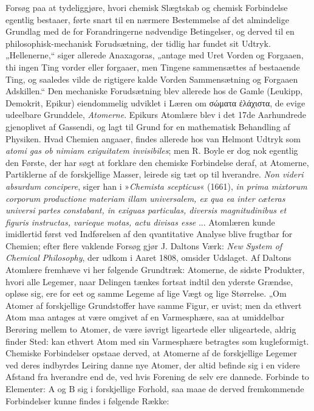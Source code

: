 \documentclass[12pt,a4paper]{book}
\begin{document}
Forsøg paa at tydeliggjøre, hvori chemisk Slægtskab og
chemisk Forbindelse egentlig bestaaer, førte snart til en nærmere
Bestemmelse af det almindelige Grundlag med de for
Forandringerne nødvendige Betingelser, og derved til en
philosophisk-mechanisk Forudsætning, der tidlig har fundet sit
Udtryk. „Hellenerne,“ siger allerede Anaxagoras, „antage med
Uret Vorden og Forgaaen, thi ingen Ting vorder eller forgaaer,
men Tingene sammensættes af bestaaende Ting, og
saaledes vilde de rigtigere kalde Vorden Sammensætning og
Forgaaen Adskillen.“ Den mechaniske Forudsætning blev allerede
hos de Gamle (Leukipp, Demokrit, Epikur) eiendommelig
udviklet i Læren om σώματα ἐλάχιστα, de evige udeelbare Grunddele,
\emph{Atomerne}. Epikurs Atomlære blev i det 17de Aarhundrede
gjenoplivet af Gassendi, og lagt til Grund for en
mathematisk Behandling af Physiken. Hvad Chemien angaaer,
findes allerede hos van Helmont Udtryk som \textit{atomi gas ob
nimiam exiguitatem invisibiles}; men R. Boyle er dog nok
egentlig den Første, der har søgt at forklare den chemiske Forbindelse
deraf, at Atomerne, Partiklerne af de forskjellige
Masser, leirede sig tæt op til hverandre. \textit{Non videri absurdum
concipere}, siger han i »\textit{Chemista scepticus}« (1661), \textit{in
prima mixtorum corporum productione materiam illam
universalem, ex qua ea inter cæteras universi partes
constabant, in exiguas particulas, diversis magnitudinibus
et figuris instructas, varieque motas, actu divisas esse} ...
Atomlæren kunde imidlertid først ved Indførelsen af den
qvantitative Analyse blive frugtbar for Chemien; efter flere
vaklende Forsøg gjør J. Daltons Værk: \textit{New System of
Chemical Philosophy}, der udkom i Aaret 1808, omsider Udslaget.
Af Daltons Atomlære fremhæve vi her følgende Grundtræk:
Atomerne, de sidste Produkter, hvori alle Legemer, naar
Delingen tænkes fortsat indtil den yderste Grændse, opløse
sig, ere for eet og samme Legeme af lige Vægt og lige Størrelse.
„Om Atomer af forskjellige Grundstoffer have samme
Figur, er uvist; men da ethvert Atom maa antages at være
omgivet af en Varmesphære, saa at umiddelbar Berøring
mellem to Atomer, de være iøvrigt ligeartede eller uligeartede,
aldrig finder Sted: kan ethvert Atom med sin Varmesphære
betragtes som kugleformigt. Chemiske Forbindelser opstaae
derved, at Atomerne af de forskjellige Legemer ved deres indbyrdes
Leiring danne nye Atomer, der altid befinde sig i en
videre Afstand fra hverandre end de, ved hvis Forening de
selv ere dannede. Forbinde to Elementer: $\mathrm{A}$ og
$\mathrm{B}$ sig i forskjellige Forhold, saa maae de derved
fremkommende Forbindelser kunne findes i følgende Række:
\end{document}
